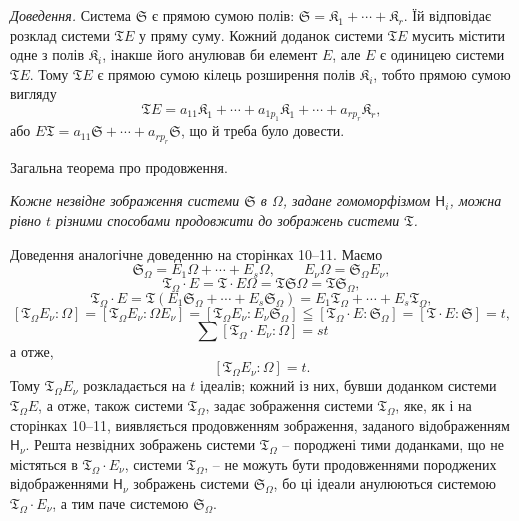\documentclass[11pt]{article}
\begin{document}
\emph{Доведення.} Система \(\mathfrak S\) є прямою сумою полів: \(\mathfrak S=\mathfrak K_1+\cdots+\mathfrak K_r\). Їй відповідає розклад системи \(\mathfrak T E\) у пряму суму. Кожний доданок системи \(\mathfrak T E\) мусить містити одне з полів \(\mathfrak K_i\), інакше його анулював би елемент \(E\), але \(E\) є одиницею системи \(\mathfrak T E\). Тому \(\mathfrak T E\) є прямою сумою кілець розширення полів \(\mathfrak K_i\), тобто прямою сумою вигляду
\[
\mathfrak T E=a_{11}\mathfrak K_1+\cdots+a_{1p_1}\mathfrak K_1+\cdots+a_{rp_r}\mathfrak K_r,
\]
або \(E\mathfrak T=a_{11}\mathfrak S+\cdots+a_{rp_r}\mathfrak S\), що й треба було довести.

\begin{center}
Загальна теорема про продовження.
\end{center}

\emph{Кожне незвідне зображення системи \(\mathfrak S\) в \(\Omega\), задане гомоморфізмом \(\mathsf{H}_i\), можна рівно \(t\) різними способами продовжити до зображень системи \(\mathfrak T\).}

Доведення аналогічне доведенню на сторінках 10--11. Маємо
\[
\mathfrak S_\Omega=E_1\Omega+\cdots+E_s\Omega,\qquad
E_\nu\Omega=\mathfrak S_\Omega E_\nu,
\]
\[
\mathfrak T_\Omega\cdot E=\mathfrak T\cdot E\Omega
=\mathfrak T\mathfrak S\Omega=\mathfrak T\mathfrak S_\Omega,
\]
\[
\mathfrak T_\Omega\cdot E
=\mathfrak T(E_1\mathfrak S_\Omega+\cdots+E_s\mathfrak S_\Omega)
=E_1\mathfrak T_\Omega+\cdots+E_s\mathfrak T_\Omega,
\]
\[
[\mathfrak T_\Omega E_\nu:\Omega]
=[\mathfrak T_\Omega E_\nu:\Omega E_\nu]
=[\mathfrak T_\Omega E_\nu:E_\nu\mathfrak S_\Omega]
\leqq[\mathfrak T_\Omega\cdot E:\mathfrak S_\Omega]
=[\mathfrak T\cdot E:\mathfrak S]=t,
\]
\[
\sum[\mathfrak T_\Omega\cdot E_\nu:\Omega]=st
\]
а отже,
\[
[\mathfrak T_\Omega E_\nu:\Omega]=t.
\]
Тому \(\mathfrak T_\Omega E_\nu\) розкладається на \(t\) ідеалів; кожний із них, бувши доданком системи \(\mathfrak T_\Omega E\), а отже, також системи \(\mathfrak T_\Omega\), задає зображення системи \(\mathfrak T_\Omega\), яке, як і на сторінках 10--11, виявляється продовженням зображення, заданого відображенням \(\mathsf{H}_\nu\). Решта незвідних зображень системи \(\mathfrak T_\Omega\) -- породжені тими доданками, що не містяться в \(\mathfrak T_\Omega\cdot E_\nu\), системи \(\mathfrak T_\Omega\), -- не можуть бути продовженнями породжених відображеннями \(\mathsf{H}_\nu\) зображень системи \(\mathfrak S_\Omega\), бо ці ідеали анулюються системою \(\mathfrak T_\Omega\cdot E_\nu\), а тим паче системою \(\mathfrak S_\Omega\).
\end{document}
